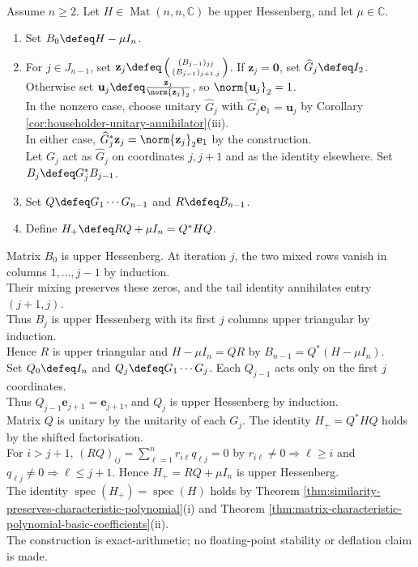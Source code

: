 \begin{computationmethod} \label{meth:hessenberg-qr-step-plane-rotations} \\
Assume $n\geq2$. Let $H\in\operatorname{Mat}(n,n,\mathbb{C})$ be upper Hessenberg, and let $\mu\in\mathbb{C}$.
\begin{enumerate}[label=(\roman*)]
\setlength{\itemsep}{0pt}
\item Set $B_0\defeq H-\mu I_n$.
\item For $j\in J_{n-1}$, set $\mathbf{z}_j\defeq\left(\begin{smallmatrix}(B_{j-1})_{jj}\\(B_{j-1})_{j+1,j}\end{smallmatrix}\right)$. If $\mathbf{z}_j=\mathbf{0}$, set $\widehat{G}_j\defeq I_2$. Otherwise set $\mathbf{u}_j\defeq\frac{\mathbf{z}_j}{\norm{\mathbf{z}_j}_2}$, so $\norm{\mathbf{u}_j}_2=1$.\\
In the nonzero case, choose unitary $\widehat{G}_j$ with $\widehat{G}_j\mathbf{e}_1=\mathbf{u}_j$ by Corollary \ref{cor:householder-unitary-annihilator}(iii).\\
In either case, $\widehat{G}_j^*\mathbf{z}_j=\norm{\mathbf{z}_j}_2\mathbf{e}_1$ by the construction.\\
Let $G_j$ act as $\widehat{G}_j$ on coordinates $j,j+1$ and as the identity elsewhere. Set $B_j\defeq G_j^*B_{j-1}$.
\item Set $Q\defeq G_1\cdots G_{n-1}$ and $R\defeq B_{n-1}$.
\item Define $H_+\defeq RQ+\mu I_n=Q^*HQ$.
\end{enumerate}
Matrix $B_0$ is upper Hessenberg. At iteration $j$, the two mixed rows vanish in columns $1,\ldots,j-1$ by induction.\\
Their mixing preserves these zeros, and the tail identity annihilates entry $(j+1,j)$.\\
Thus $B_j$ is upper Hessenberg with its first $j$ columns upper triangular by induction.\\
Hence $R$ is upper triangular and $H-\mu I_n=QR$ by $B_{n-1}=Q^*(H-\mu I_n)$.\\
Set $Q_0\defeq I_n$ and $Q_j\defeq G_1\cdots G_j$. Each $Q_{j-1}$ acts only on the first $j$ coordinates.\\
Thus $Q_{j-1}\mathbf{e}_{j+1}=\mathbf{e}_{j+1}$, and $Q_j$ is upper Hessenberg by induction.\\
Matrix $Q$ is unitary by the unitarity of each $G_j$. The identity $H_+=Q^*HQ$ holds by the shifted factorisation.\\
For $i>j+1$, $(RQ)_{ij}=\sum\limits_{\ell=1}^{n}r_{i\ell}q_{\ell j}=0$ by $r_{i\ell}\neq0\Longrightarrow\ell\geq i$ and $q_{\ell j}\neq0\Longrightarrow\ell\leq j+1$. Hence $H_+=RQ+\mu I_n$ is upper Hessenberg.\\
The identity $\operatorname{spec}(H_+)=\operatorname{spec}(H)$ holds by Theorem \ref{thm:similarity-preserves-characteristic-polynomial}(i) and Theorem \ref{thm:matrix-characteristic-polynomial-basic-coefficients}(ii).\\
The construction is exact-arithmetic; no floating-point stability or deflation claim is made.
\end{computationmethod}
